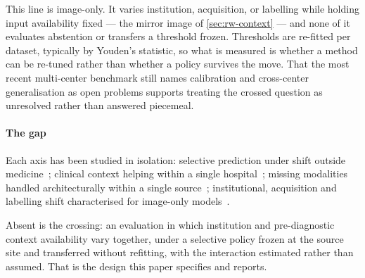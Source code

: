 This line is image-only. It varies institution, acquisition, or labelling while
holding input availability fixed --- the mirror image of
\cref{sec:rw-context} --- and none of it evaluates abstention or transfers a
threshold frozen. Thresholds are re-fitted per dataset, typically by Youden's
statistic, so what is measured is whether a method can be re-tuned rather than
whether a policy survives the move. That the most recent multi-center benchmark
still names calibration and cross-center generalisation as open problems
supports treating the crossed question as unresolved rather than answered
piecemeal.

\paragraph{The gap}

Each axis has been studied in isolation: selective prediction under shift
outside medicine~\cite{selective_shift_2025}; clinical context helping within a
single hospital~\cite{yang2025mcxnet,sloan2025clinically}; missing modalities
handled architecturally within a single
source~\cite{wang2025missing,wang2025moehealth}; institutional, acquisition and
labelling shift characterised for image-only
models~\cite{cohen2020limits,cxrlt2026,farquhar2026acquisition}.

Absent is the crossing: an evaluation in which institution and pre-diagnostic
context availability vary together, under a selective policy frozen at the
source site and transferred without refitting, with the interaction estimated
rather than assumed. That is the design this paper specifies and reports.
